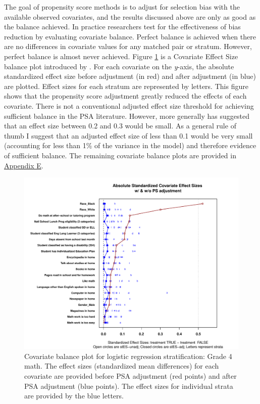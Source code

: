 \documentclass[letterpaper,12pt]{article} %
\begin{document}
The goal of propensity score methods is to adjust for selection bias with the available observed covariates, and the results discussed above are only as good as the balance achieved. In practice researchers test for the effectiveness of bias reduction by evaluating covariate balance. Perfect balance is achieved when there are no differences in covariate values for any matched pair or stratum. However, perfect balance is almost never achieved. Figure \ref{fig:g4math:balance} is a Covariate Effect Size balance plot introduced by . For each covariate on the \textit{y}-axis, the absolute standardized effect size before adjustment (in red) and after adjustment (in blue) are plotted. Effect sizes for each stratum are represented by letters. This figure shows that the propensity score adjustment greatly reduced the effects of each covariate. There is not a conventional adjusted effect size threshold for achieving sufficient balance in the PSA literature. However, more generally  has suggested that an effect size between 0.2 and 0.3 would be small. As a general rule of thumb I suggest that an adjusted effect size of less than 0.1 would be very small (accounting for less than 1\% of the variance in the model) and therefore evidence of sufficient balance. The remaining covariate balance plots are provided in \hyperref[appendixE]{Appendix E}.



\setlength{\belowcaptionskip}{-10pt}
\begin{figure}[t]
\begin{center}
\includegraphics[width=\textwidth]{../Figures2009/g4math-lr-balance.pdf}
\caption[Covariate balance plot for logistic regression stratification: Grade 4 math]{Covariate balance plot \cite{HelmreichPruzek2009} for logistic regression stratification: Grade 4 math. The effect sizes (standardized mean differences) for each covariate are provided before PSA adjustment (red points) and after PSA adjustment (blue points). The effect sizes for individual strata are provided by the blue letters.}
\label{fig:g4math:balance}
\end{center}
\end{figure}
\setlength{\belowcaptionskip}{0pt}
\end{document}
